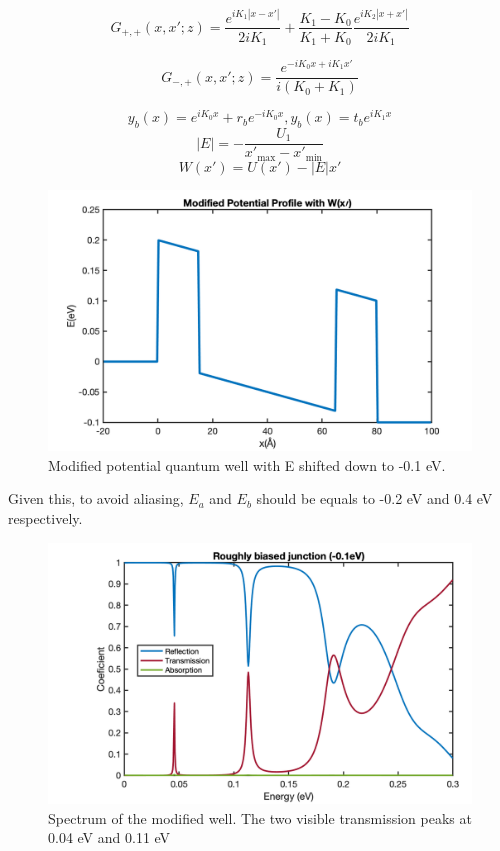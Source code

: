 \documentclass[twocolumn]{article}[ht]
\begin{document}
\begin{equation}
    G_{+,+}(x,x';z) = \frac{e^{iK_1 |x-x'|}}{2iK_1} + \frac{K_1 - K_0}{K_1 + K_0} \frac{e^{iK_2 |x+x'|}}{2iK_1}
\end{equation}

\begin{equation}
    G_{-,+}(x,x';z) = \frac{e^{-iK_0x + iK_1x'}}{i(K_0 + K_1)}
\end{equation}
    
\begin{equation}
    y_b(x) = e^{iK_0x} + r_b e^{-iK_0x}, y_b(x) = t_b e^{iK_1x}
\end{equation}
\begin{equation}
    |E| = -\frac{U_1}{x'_{\text{max}} - x'_{\text{min}}}
\end{equation}
\begin{equation}
    W(x') = U(x') - |E|x'
\end{equation}
\begin{figure}[ht]
    \centering
    \includegraphics[width=0.9\linewidth]{biased_junction.png}
    \caption{Modified potential quantum well with E shifted down to -0.1 eV.}
    \label{fig:example-5}
\end{figure}
Given this, to avoid aliasing, $E_a$ and $E_b$ should be equals to -0.2 eV and 0.4 eV respectively.
\begin{figure}[ht]
    \centering
    \hspace{-1cm}
    \includegraphics[width=0.9\linewidth]{roughly_biased_junction_spectra(-0.1eV).png}
    \caption{Spectrum of the modified well. The two visible transmission peaks at 0.04 eV and 0.11 eV}
    \label{fig:example-6}
\end{figure}
\end{document}
